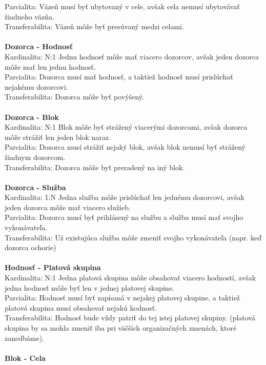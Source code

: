 \documentclass[slovak, 12pt, Times New Roman]{article}
\begin{document}
				Parcialita: Väzeň musí byť ubytovaný v cele, avšak cela nemusí ubytovávať žiadneho väzňa.\\ 
				Transferabilita: Väzeň môže byť presúvaný medzi celami.\\ \\
			\textbf{Dozorca - Hodnosť} \\
				Kardinalita: N:1 Jednu hodnosť môže mať viacero dozorcov, avšak jeden dozorca môže mať len jednu hodnosť.\\
				Parcialita: Dozorca musí mať hodnosť, a taktiež hodnosť musí prislúchať nejakému dozorcovi.\\ 
				Transferabilita: Dozorca môže byť povýšený.\\ \\
			\textbf{Dozorca - Blok} \\
				Kardinalita: N:1 Blok môže byť strážený viacerými dozorcami, avšak dozorca môže strážiť len jeden blok naraz.\\
				Parcialita: Dozorca musí strážiť nejaký blok, avšak blok nemusí byť strážený žiadnym dozorcom.\\ 
				Transferabilita: Dozorca môže byť preradený na iný blok.\\ \\
			\textbf{Dozorca - Služba} \\
				Kardinalita: 1:N Jedna služba môže prislúchať len jednému dozorcovi, avšak jeden dozorca môže mať viacero služieb.\\
				Parcialita: Dozorca musí byť prihlásený na službu a služba musí mať svojho vykonávateľa.\\ 
				Transferabilita: Už existujúca služba môže zmeniť svojho vykonávateľa (napr. keď dozorca ochorie)\\ \\
			\textbf{Hodnosť - Platová skupina} \\
				Kardinalita: N:1 Jedna platová skupina môže obsahovať viacero hodností, avšak jedna hodnosť môže byť len v jednej platovej 
				skupine.\\
				Parcialita: Hodnosť musí byť zapísaná v nejakej platovej skupine, a taktiež platová skupina musí obsahovať nejakú hodnosť.\\ 
				Transferabilita: Hodnosť bude vždy patriť do tej istej platovej skupiny. (platová skupina by sa mohla zmeniť iba pri väčších organizačných zmenách, ktoré zanedbáme).\\ \\
			\textbf{Blok - Cela} \\
\end{document}
